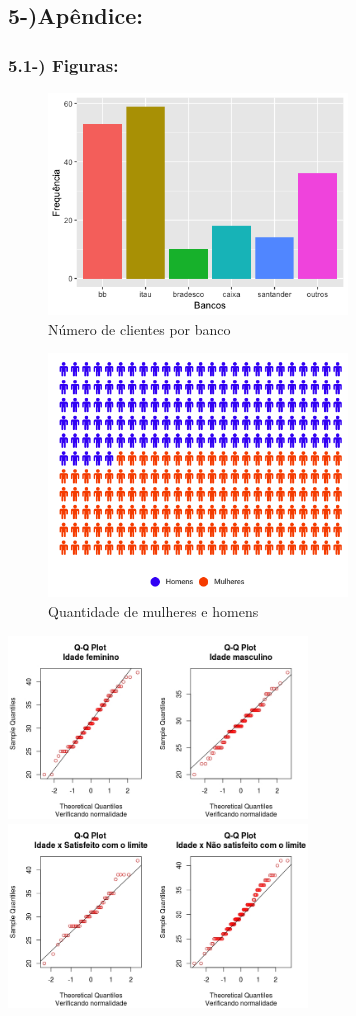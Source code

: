\documentclass[]{article}
\begin{document}
\subsection{5-)Apêndice:}\label{apendice}

\subsubsection{5.1-) Figuras:}\label{figuras}

\begin{figure}
\centering
\includegraphics[width=3.12500in]{Bancos.png}
\caption{Número de clientes por banco}
\end{figure}

\begin{figure}
\centering
\includegraphics[width=3.12500in]{pictograma.png}
\caption{Quantidade de mulheres e homens}
\end{figure}

\includegraphics[width=3.12500in]{QQ Plot idade genero.jpeg}
\includegraphics[width=3.12500in]{QQplot Idade x Lim.jpeg}
\end{document}
